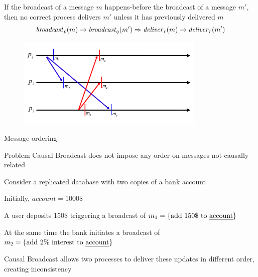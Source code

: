 \begin{frame}

\begin{definition}
If the broadcast of a message $m$ \alert{happens-before} the broadcast of a message $m'$, then 
no correct process delivers $m'$ unless it has previously delivered $m$
\[
  \mathit{broadcast}_p(m) \rightarrow \mathit{broadcast}_q(m') \Rightarrow \mathit{deliver}_r(m) \rightarrow \mathit{deliver}_r(m')
\]
\end{definition}

 

\begin{figure}
\includegraphics[width=0.8\textwidth]{figs/04/rb-causal1}
\end{figure}
		
\end{frame}

\begin{frame}{Message ordering}
\begin{block}{Problem}
Causal Broadcast does not impose any order on messages not causally related
\end{block}
\begin{example}
\BI
\item Consider a replicated database with two copies of a bank account
\item Initially, $\mathit{account} = 1000\$$
\item A user deposits 150\$ triggering a broadcast of $m_1 = \{ \textrm{add 150\$ to \emph{account}} \}$  
\item At the same time the bank initiates a broadcast of $m_2 = \{ \textrm{add 2\% interest to \emph{account}} \}$
\item Causal Broadcast allows two processes to deliver these updates in different order, creating inconsistency
\EI
\end{example}
\end{frame}



